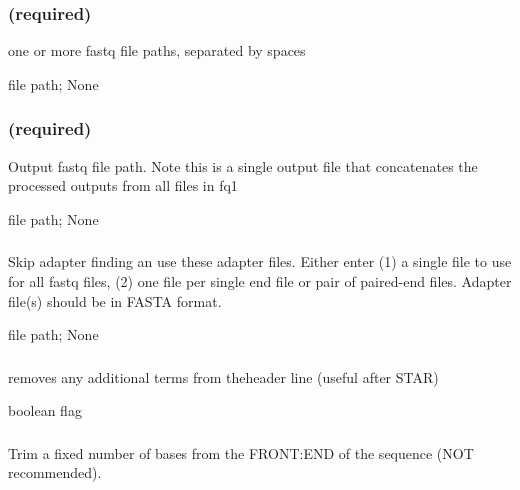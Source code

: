 \documentclass[letterpaper,11pt,english]{sphinxmanual}
\begin{document}
\subsubsection{ (required)}
\label{\detokenize{prog_desc:id4}}
 one or more fastq file paths, separated by spaces

 file path;  None


\subsubsection{ (required)}
\label{\detokenize{prog_desc:out1-required}}
 Output fastq file path. Note this is a single output file that concatenates the processed outputs from all files in \textendash{}fq1

 file path;  None


\subsubsection{}
\label{\detokenize{prog_desc:a-adapters}}
 Skip adapter finding an use these adapter files. Either enter (1) a single  file to use for all fastq files, (2)  one file per single end file or pair  of paired-end files. Adapter file(s) should be in FASTA format.

 file path;  None


\subsubsection{}
\label{\detokenize{prog_desc:clean-header}}
 removes any additional terms from theheader line (useful after STAR)

 boolean flag


\subsubsection{}
\label{\detokenize{prog_desc:f-trim-fixed}}
 Trim a fixed number of bases from the FRONT:END of the sequence (NOT recommended).
\end{document}
